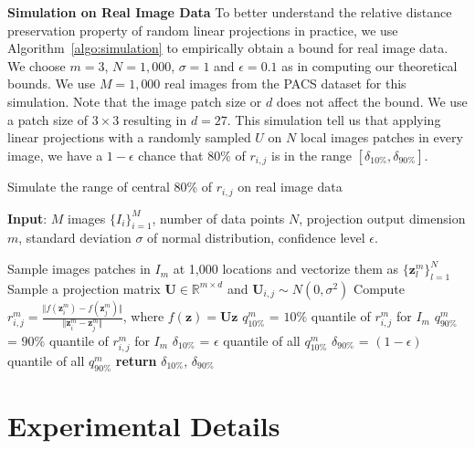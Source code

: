 \documentclass{article} \usepackage{iclr2021_conference,times}
\newcommand{\norms}[1]{\Vert#1\Vert}
\begin{document}
\textbf{Simulation on Real Image Data} To better understand the relative distance preservation property of random linear projections in practice, we use Algorithm~\ref{algo:simulation} to empirically obtain a bound for real image data. We choose $m=3$, $N=1,000$, $\sigma=1$ and $\epsilon=0.1$ as in computing our theoretical bounds. We use  $M=1,000$ real images from the PACS dataset for this simulation. Note that the image patch size or $d$ does not affect the bound. We use a patch size of $3\times3$ resulting in $d=27$. This simulation tell us that applying linear projections with a randomly sampled $U$ on $N$ local images patches in every image, we have a $1-\epsilon$ chance that $80\%$ of $r_{i,j}$ is in the range $[\delta_{10\%}, \delta_{90\%}]$. 		

\begin{algorithm}[h]
	\small
	\caption{Simulate the range of central 80\% of ${r_{i,j}}$ on real image data}
	\label{algo:simulation}
	\begin{algorithmic}[1]
		\State \textbf{Input}: $M$ images $\{I_i\}_{i=1}^{M}$, number of data points $N$, projection output dimension $m$, standard deviation $\sigma$ of normal distribution, confidence level $\epsilon$.


		\State Sample images patches in $I_m$ at 1,000 locations and vectorize them as $\{\mathbf{z}_l^m\}_{l=1}^{N}$
		\State Sample a projection matrix $\mathbf{U} \in \mathbb{R}^{m \times d}$ and $\mathbf{U}_{i,j} \sim N(0,\sigma^2)$
		\State Compute $r_{i,j}^m = \frac{\norms{f(\mathbf{z}_i^m) - f(\mathbf{z}_j^m)}}{\norms{\mathbf{z}_i^m - \mathbf{z}_j^m}}$, where $f(\mathbf{z}) = \mathbf{U} \mathbf{z}$
		\EndFor	
		\EndFor
		\State $q^m_{10\%}$ = $10\%$ quantile of $r_{i,j}^m$ for $I_m$ 
		\State $q^m_{90\%}$	= $90\%$ quantile of $r_{i,j}^m$ for $I_m$ 
		\EndFor	
		\State $\delta_{10\%}$ = $\epsilon$ quantile of all $q^m_{10\%}$ 
		\State $\delta_{90\%}$ = $(1-\epsilon)$ quantile of all $q^m_{90\%}$
		\State \textbf{return} $\delta_{10\%}$, $\delta_{90\%}$		 
	\end{algorithmic}
\end{algorithm}


\section{Experimental Details}
\label{exp_detail}
\end{document}
